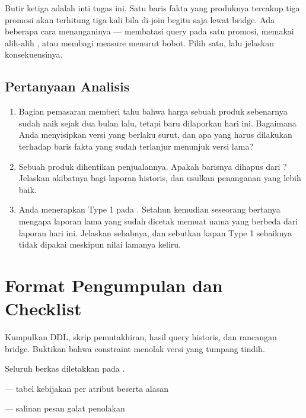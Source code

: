 \begin{catatan}
Butir ketiga adalah inti tugas ini. Satu baris fakta yang produknya tercakup
tiga promosi akan terhitung tiga kali bila di-join begitu saja lewat bridge.
Ada beberapa cara menanganinya --- membatasi query pada satu promosi,
memakai  alih-alih , atau membagi measure
menurut bobot. Pilih satu, lalu jelaskan konsekuensinya.
\end{catatan}

\subsection{Pertanyaan Analisis}

\begin{enumerate}[leftmargin=1.4em]
  \item Bagian pemasaran memberi tahu bahwa harga sebuah produk sebenarnya
        sudah naik sejak dua bulan lalu, tetapi baru dilaporkan hari ini.
        Bagaimana Anda menyisipkan versi yang berlaku surut, dan apa yang harus
        dilakukan terhadap baris fakta yang sudah terlanjur menunjuk versi
        lama?
  \item Sebuah produk dihentikan penjualannya. Apakah barisnya dihapus dari
        ? Jelaskan akibatnya bagi laporan historis, dan
        usulkan penanganan yang lebih baik.
  \item Anda menerapkan Type 1 pada . Setahun kemudian
        seseorang bertanya mengapa laporan lama yang sudah dicetak memuat nama
        yang berbeda dari laporan hari ini. Jelaskan sebabnya, dan sebutkan
        kapan Type 1 sebaiknya tidak dipakai meskipun nilai lamanya keliru.
\end{enumerate}

\section{Format Pengumpulan dan Checklist}

Kumpulkan DDL, skrip pemutakhiran, hasil query historis, dan rancangan bridge.
Buktikan bahwa constraint menolak versi yang tumpang tindih.

Seluruh berkas diletakkan pada .

\begin{ceklis}
  \item {}
  \item {} --- tabel kebijakan per atribut beserta alasan
  \item {}
  \item {}
  \item {} --- salinan pesan galat penolakan
  \item {}
  \item {}
  \item {}
\end{ceklis}

